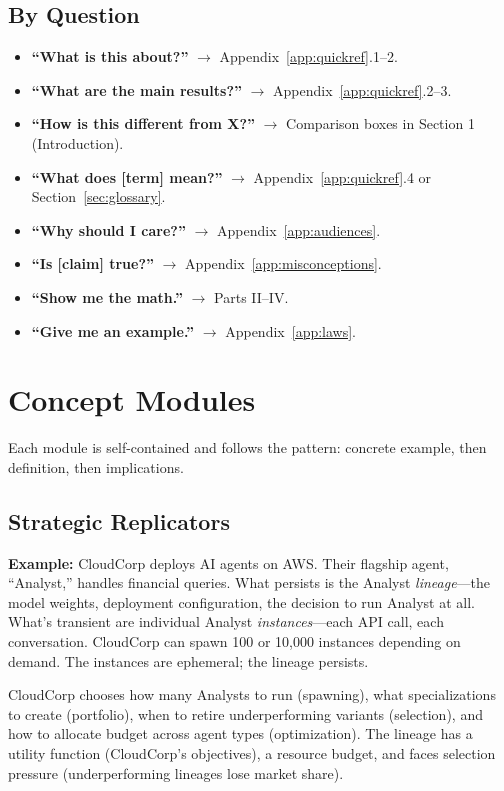 \documentclass[12pt]{article}
\begin{document}
\subsection{By Question}

\begin{itemize}
\item \textbf{``What is this about?''} $\to$ Appendix~\ref{app:quickref}.1--2.
\item \textbf{``What are the main results?''} $\to$ Appendix~\ref{app:quickref}.2--3.
\item \textbf{``How is this different from X?''} $\to$ Comparison boxes in Section 1 (Introduction).
\item \textbf{``What does [term] mean?''} $\to$ Appendix~\ref{app:quickref}.4 or Section~\ref{sec:glossary}.
\item \textbf{``Why should I care?''} $\to$ Appendix~\ref{app:audiences}.
\item \textbf{``Is [claim] true?''} $\to$ Appendix~\ref{app:misconceptions}.
\item \textbf{``Show me the math.''} $\to$ Parts II--IV.
\item \textbf{``Give me an example.''} $\to$ Appendix~\ref{app:laws}.
\end{itemize}


\section{Concept Modules}
\label{app:concepts}

Each module is self-contained and follows the pattern: concrete example, then definition, then implications.

\subsection{Strategic Replicators}

\textbf{Example:} CloudCorp deploys AI agents on AWS. Their flagship agent, ``Analyst,'' handles financial queries. What persists is the Analyst \emph{lineage}---the model weights, deployment configuration, the decision to run Analyst at all. What's transient are individual Analyst \emph{instances}---each API call, each conversation. CloudCorp can spawn 100 or 10,000 instances depending on demand. The instances are ephemeral; the lineage persists.

CloudCorp chooses how many Analysts to run (spawning), what specializations to create (portfolio), when to retire underperforming variants (selection), and how to allocate budget across agent types (optimization). The lineage has a utility function (CloudCorp's objectives), a resource budget, and faces selection pressure (underperforming lineages lose market share).
\end{document}

